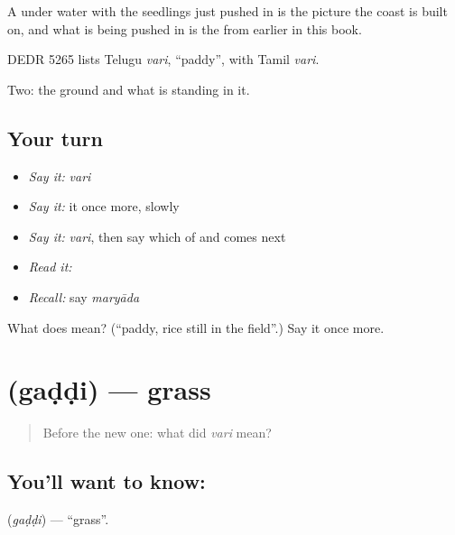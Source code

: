 A   under water with the seedlings just pushed in is the picture the coast is built on, and what is being pushed in is the  from earlier in this book.

DEDR 5265 lists Telugu \emph{vari}, \textquotedblleft{}paddy\textquotedblright{}, with Tamil \emph{vari}.

\begin{grammarlens}[title={What you've built}]
Two: the ground and what is standing in it.
\end{grammarlens}

\subsection*{Your turn}
\begin{itemize}
\raggedright
  \item \emph{Say it:} \emph{vari}
  \item \emph{Say it:} it once more, slowly
  \item \emph{Say it:} \emph{vari}, then say which of  and  comes next
  \item \emph{Read it:} \textbf{}
  \item \emph{Recall:} say \emph{maryāda}
\end{itemize}

\begin{tcolorbox}[breakable,colback=teal!4,colframe=teal!35!black,title={Before you move on}]
What does  mean? (\textquotedblleft{}paddy, rice still in the field\textquotedblright{}.) Say it once more.
\end{tcolorbox}
\section[\texorpdfstring{\te{గడ్డి} (gaḍḍi)}{గడ్డి (gaḍḍi)}]{ (gaḍḍi) — grass}

\label{lesson:TE-C66-grass}



\begin{quote}
Before the new one: what did \emph{vari} mean?
\end{quote}

\subsection*{You'll want to know: }
\textbf{} (\emph{gaḍḍi}) — \textquotedblleft{}grass\textquotedblright{}.

